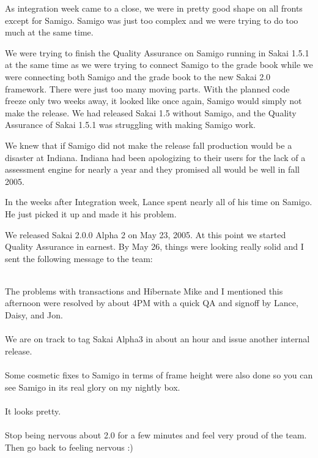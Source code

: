 \documentclass[12pt]{book}
\begin{document}
As integration week came to a close, we were in pretty
good shape on all fronts except for Samigo.  Samigo was
just too complex and we were trying to do too much at the
same time.

We were trying to finish the Quality Assurance on Samigo
running in Sakai 1.5.1 at the same time as we were trying
to connect Samigo to the grade book while we were
connecting both Samigo and the grade book to the new Sakai
2.0 framework. There were just too many moving parts.
With the planned code freeze only two weeks away,
it looked like once
again, Samigo would simply not make the release.   We had
released Sakai 1.5 without Samigo, and the Quality Assurance
of Sakai 1.5.1 was struggling with making Samigo work.

We knew that if Samigo did not make the release
fall production would be a disaster at Indiana.
Indiana had been apologizing to their users for the lack
of a assessment engine for nearly a year and
they promised all would be well in fall 2005.

In the weeks after Integration week, Lance spent nearly
all of his time on Samigo.  He just picked it up and made
it his problem.

We released Sakai 2.0.0 Alpha 2 on May 23, 2005.  At
this point we started Quality Assurance in earnest.
By May 26, things were looking really solid and I sent
the following message to the team:\\
\\
\begin{sf}
The problems with transactions and Hibernate Mike and I
mentioned this afternoon were resolved by about 4PM with
a quick QA and signoff by Lance, Daisy, and Jon.\\
\\
We are on track to tag Sakai Alpha3 in about an hour and
issue another internal release.\\
\\
Some cosmetic fixes to Samigo in terms of frame height
were also done so you can see Samigo in its real glory on
my nightly box.\\
\\
It looks pretty.\\
\\
Stop being nervous about 2.0 for a few minutes and feel
very proud of the team.  Then go back to feeling nervous :)\\
\end{sf}
\end{document}
